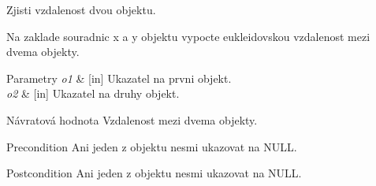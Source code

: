 Zjisti vzdalenost dvou objektu. 

Na zaklade souradnic \textquotesingle{}x\textquotesingle{} a \textquotesingle{}y\textquotesingle{} objektu vypocte eukleidovskou vzdalenost mezi dvema objekty.


\begin{DoxyParams}{Parametry}
{\em o1} & \mbox{[}in\mbox{]} Ukazatel na prvni objekt. \\
\hline
{\em o2} & \mbox{[}in\mbox{]} Ukazatel na druhy objekt. \\
\hline
\end{DoxyParams}
\begin{DoxyReturn}{Návratová hodnota}
Vzdalenost mezi dvema objekty.
\end{DoxyReturn}
\begin{DoxyPrecond}{Precondition}
Ani jeden z objektu nesmi ukazovat na \textquotesingle{}N\+U\+LL\textquotesingle{}. 
\end{DoxyPrecond}
\begin{DoxyPostcond}{Postcondition}
Ani jeden z objektu nesmi ukazovat na \textquotesingle{}N\+U\+LL\textquotesingle{}. 
\end{DoxyPostcond}
